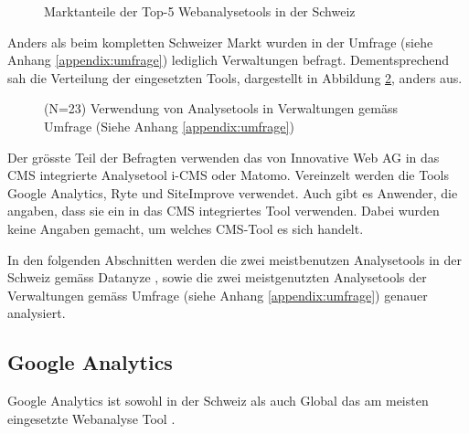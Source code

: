 \begin{figure}[h]
  \centering
{}
\caption{Marktanteile der Top-5 Webanalysetools in der Schweiz \parencite{datanyzeSwitzerlandWebanalytics}}
\label{fig:marktanteil}
\end{figure}


Anders als beim kompletten Schweizer Markt wurden in der Umfrage (siehe Anhang \ref{appendix:umfrage}) lediglich Verwaltungen befragt. Dementsprechend sah die Verteilung der eingesetzten Tools, dargestellt in Abbildung \ref{fig:verwVerteilungTools}, anders aus.

\begin{figure}[h]
  \centering
{}
\caption{(N=23) Verwendung von Analysetools in Verwaltungen gemäss Umfrage (Siehe Anhang \ref{appendix:umfrage})}
\label{fig:verwVerteilungTools}
\end{figure}

\newpage

Der grösste Teil der Befragten verwenden das von Innovative Web AG in das CMS integrierte Analysetool i-CMS oder Matomo. Vereinzelt werden die Tools Google Analytics, Ryte und SiteImprove verwendet. Auch gibt es Anwender, die angaben, dass sie ein in das CMS integriertes Tool verwenden. Dabei wurden keine Angaben gemacht, um welches CMS-Tool es sich handelt.

In den folgenden Abschnitten werden die zwei meistbenutzen Analysetools in der Schweiz gemäss Datanyze \parencite{datanyzeSwitzerlandWebanalytics}, sowie die zwei meistgenutzten Analysetools der Verwaltungen gemäss Umfrage (siehe Anhang \ref{appendix:umfrage}) genauer analysiert.


\subsection{Google Analytics}\label{subsec:GoogleAnalytics}
Google Analytics ist sowohl in der Schweiz als auch Global das am meisten eingesetzte Webanalyse Tool \parencite{datanyzeSwitzerlandWebanalytics}. 

